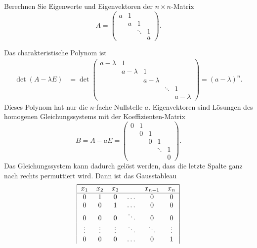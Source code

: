 Berechnen Sie Eigenwerte und Eigenvektoren der $n\times n$-Matrix
\[
A=\begin{pmatrix}
a    &1      &      &      \\
     &      a&     1&      \\
     &       &\ddots&     1\\
     &       &      &     a
\end{pmatrix}.
\]


\begin{loesung}
Das charakteristische Polynom ist
\begin{align*}
\operatorname{det}(A-\lambda E)
&=
\operatorname{det}\begin{pmatrix}
a-\lambda&        1&         &         &         \\
         &a-\lambda&        1&         &         \\
         &         &a-\lambda&         &         \\
         &         &         &\ddots   &        1\\
         &         &         &         &a-\lambda
\end{pmatrix}
=(a-\lambda)^n.
\end{align*}
Dieses Polynom hat nur die $n$-fache Nullstelle $a$.
Eigenvektoren sind Lösungen des homogenen Gleichungssystems
mit der Koeffizienten-Matrix
\[
B=A-aE=\begin{pmatrix}
0&1& &      & \\
 &0&1&      & \\
 & &0&     1& \\
 & & &\ddots&1\\
 & & &      &0
\end{pmatrix}.
\]
Das Gleichungssystem kann dadurch gelöst werden, dass die
letzte Spalte ganz nach rechts permuttiert wird. Dann ist das
Gausstableau
\[
\begin{tabular}{|cccccc|}
\hline
$x_1$&$x_2$&$x_3$&&$x_{n-1}$&$x_n$\\
\hline
0       &1       &0       &$ \dots$&0       &0       \\
0       &0       &1       &$ \dots$&0       &0       \\
0       &0       &0       &$\ddots$&0       &0       \\
$\vdots$&$\vdots$&$\vdots$&$\ddots$&$\ddots$&$\vdots$\\
0       &0       &0       &$ \dots$&0       &1       \\

\end{tabular}\]
\end{loesung}
